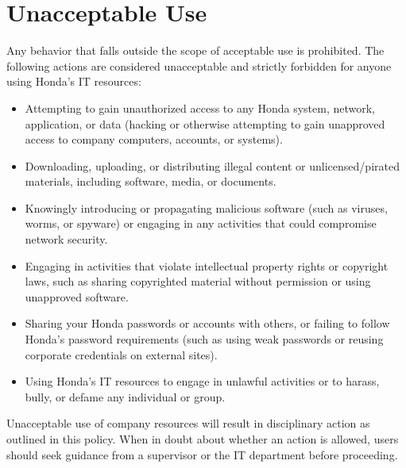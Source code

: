 \section{Unacceptable Use}
Any behavior that falls outside the scope of acceptable use is prohibited. The following actions are considered unacceptable and strictly forbidden for anyone using Honda's IT resources:
\begin{itemize}
    \item Attempting to gain unauthorized access to any Honda system, network, application, or data (hacking or otherwise attempting to gain unapproved access to company computers, accounts, or systems).
    \item Downloading, uploading, or distributing illegal content or unlicensed/pirated materials, including software, media, or documents.
    \item Knowingly introducing or propagating malicious software (such as viruses, worms, or spyware) or engaging in any activities that could compromise network security.
    \item Engaging in activities that violate intellectual property rights or copyright laws, such as sharing copyrighted material without permission or using unapproved software.
    \item Sharing your Honda passwords or accounts with others, or failing to follow Honda's password requirements (such as using weak passwords or reusing corporate credentials on external sites).
    \item Using Honda's IT resources to engage in unlawful activities or to harass, bully, or defame any individual or group.
\end{itemize}
Unacceptable use of company resources will result in disciplinary action as outlined in this policy. When in doubt about whether an action is allowed, users should seek guidance from a supervisor or the IT department before proceeding.

